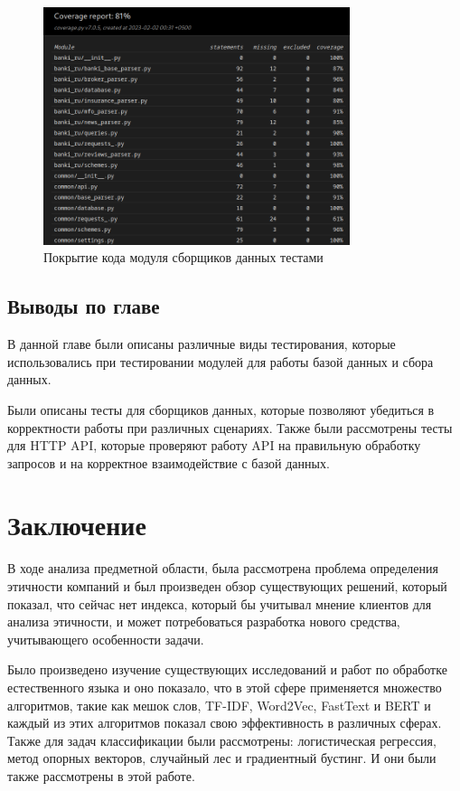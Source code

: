 \documentclass[PI, VKR]{HSEUniversity}
\begin{document}
\begin{figure}[h]
\centering
\includegraphics[width=0.8\textwidth]{img/parser_coverage.png}
\caption{\label{fig:parser_coverage}Покрытие кода модуля сборщиков данных тестами}
\end{figure}
\section{Выводы по главе}
\label{sec:org6ab7756}
В данной главе были описаны различные виды тестирования, которые использовались при тестировании модулей для работы базой данных и сбора данных.

Были описаны тесты для сборщиков данных, которые позволяют убедиться в корректности работы при различных сценариях. Также были рассмотрены тесты для HTTP API, которые проверяют работу API на правильную обработку запросов и на корректное взаимодействие с базой данных.
\chapter*{Заключение}
\label{sec:orgba0a517}
В ходе анализа предметной области, была рассмотрена проблема определения этичности компаний и был произведен обзор существующих решений, который показал, что сейчас нет индекса, который бы учитывал мнение клиентов для анализа этичности, и может потребоваться разработка нового средства, учитывающего особенности задачи.

Было произведено изучение существующих исследований и работ по обработке естественного языка и оно показало, что в этой сфере применяется множество алгоритмов, такие как мешок слов, TF-IDF, Word2Vec, FastText и BERT и каждый из этих алгоритмов показал свою эффективность в различных сферах. Также для задач классификации были рассмотрены: логистическая регрессия, метод опорных векторов, случайный лес и градиентный бустинг. И они были также рассмотрены в этой работе.
\end{document}
